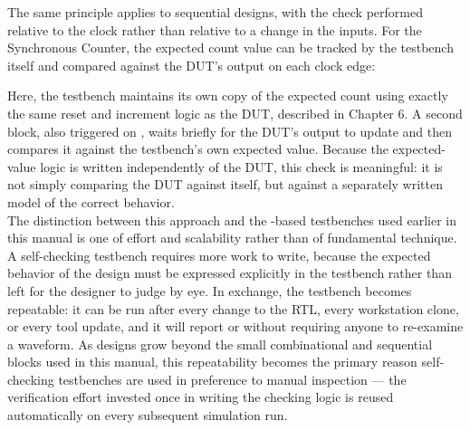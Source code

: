 \noindent The same principle applies to sequential designs, with the check performed relative to the clock rather than relative to a change in the inputs. For the Synchronous Counter, the expected count value can be tracked by the testbench itself and compared against the DUT's output on each clock edge:


\noindent Here, the testbench maintains its own copy of the expected count using exactly the same reset and increment logic as the DUT, described in Chapter 6. A second  block, also triggered on , waits briefly for the DUT's output to update and then compares it against the testbench's own expected value. Because the expected-value logic is written independently of the DUT, this check is meaningful: it is not simply comparing the DUT against itself, but against a separately written model of the correct behavior.\\

\noindent The distinction between this approach and the -based testbenches used earlier in this manual is one of effort and scalability rather than of fundamental technique. A self-checking testbench requires more work to write, because the expected behavior of the design must be expressed explicitly in the testbench rather than left for the designer to judge by eye. In exchange, the testbench becomes repeatable: it can be run after every change to the RTL, every workstation clone, or every tool update, and it will report  or  without requiring anyone to re-examine a waveform. As designs grow beyond the small combinational and sequential blocks used in this manual, this repeatability becomes the primary reason self-checking testbenches are used in preference to manual inspection — the verification effort invested once in writing the checking logic is reused automatically on every subsequent simulation run.\\

